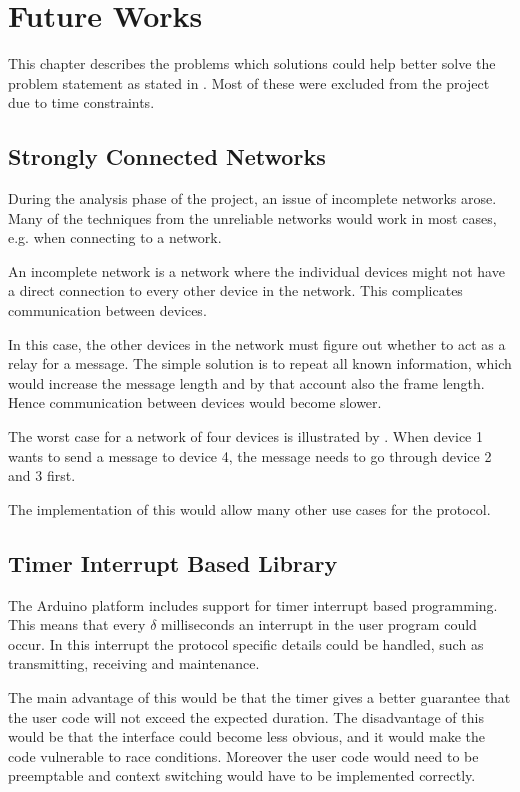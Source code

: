 \chapter{Future Works}
This chapter describes the problems which solutions could help better solve the problem statement as stated in . 
Most of these were excluded from the project due to time constraints.

\section{Strongly Connected Networks}
During the analysis phase of the project, an issue of incomplete networks arose.  
Many of the techniques from the unreliable networks would work in most cases, e.g. when connecting to a network. 

An incomplete network is a network where the individual devices might not have a direct connection to every other device in the network. 
This complicates communication between devices.


In this case, the other devices in the network must figure out whether to act as a relay for a message. 
The simple solution is to repeat all known information, which would increase the message length and by that account also the frame length.
Hence communication between devices would become slower.

The worst case for a network of four devices is illustrated by .
When device 1 wants to send a message to device 4, the message needs to go through device 2 and 3 first.

The implementation of this would allow many other use cases for the protocol. 

\section{Timer Interrupt Based Library}
The Arduino platform includes support for timer interrupt based programming.
This means that every $\delta$ milliseconds an interrupt in the user program could occur.
In this interrupt the protocol specific details could be handled, such as transmitting, receiving and maintenance.

The main advantage of this would be that the timer gives a better guarantee that the user code will not exceed the expected duration.
The disadvantage of this would be that the interface could become less obvious, and it would make the code vulnerable to race conditions.
Moreover the user code would need to be preemptable and context switching would have to be implemented correctly.

